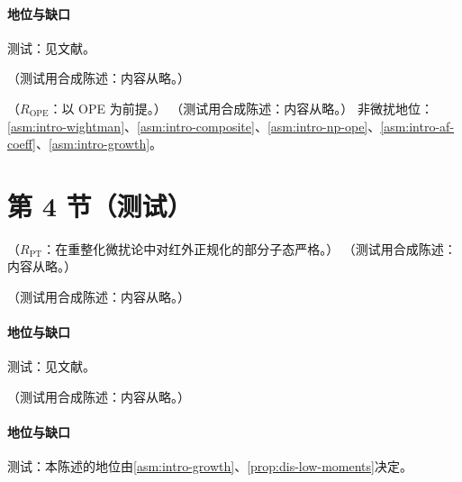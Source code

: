 \paragraph{地位与缺口}测试：见文献。

\begin{definition}[极化结构函数]\label{def:coll-g1}
（测试用合成陈述：内容从略。）
\end{definition}

\begin{theorem}\label{thm:coll-g1-moments}
（$R_{\mathrm{OPE}}$：以 OPE 为前提。）
（测试用合成陈述：内容从略。）
非微扰地位：\cref{asm:intro-wightman}、\cref{asm:intro-composite}、\cref{asm:intro-np-ope}、\cref{asm:intro-af-coeff}、\cref{asm:intro-growth}。
\end{theorem}

\section{第 4 节（测试）}\label{sec:coll-polarized}

\begin{proposition}\label{prop:coll-anomaly-scheme}
（$R_{\mathrm{PT}}$：在重整化微扰论中对红外正规化的部分子态严格。）
（测试用合成陈述：内容从略。）
\end{proposition}

\begin{proposition}\label{prop:coll-ellis-jaffe}
（测试用合成陈述：内容从略。）
\end{proposition}
\paragraph{地位与缺口}测试：见文献。

\begin{conjecture}\label{conj:coll-bc}
（测试用合成陈述：内容从略。）
\end{conjecture}
\paragraph{地位与缺口}测试：本陈述的地位由\cref{asm:intro-growth}、\cref{prop:dis-low-moments}决定。

